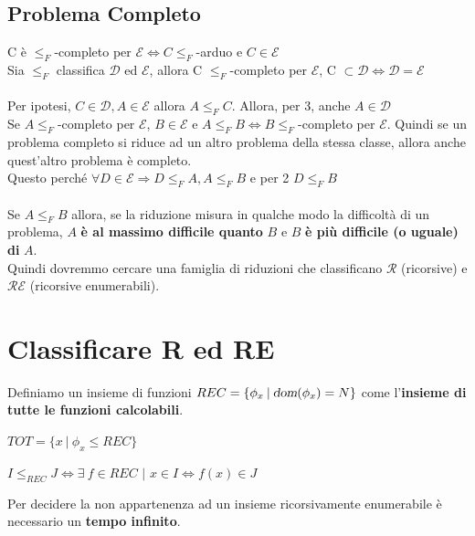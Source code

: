 \documentclass[10pt]{book}
\begin{document}
\subsection{Problema Completo}
C è $\leq_F$-completo per $\mathscr{E} \Leftrightarrow C \leq_F$-arduo e $C \in \mathscr{E}$\\
Sia $\leq_F$ classifica $\mathscr{D}$ ed $\mathscr{E}$, allora C $\leq_F$-completo per $\mathscr{E}$, C $\subset \mathscr{D} \Leftrightarrow \mathscr{D} = \mathscr{E}$\\\\
Per ipotesi, $C \in \mathscr{D}, A \in \mathscr{E}$ allora $A \leq_F C$. Allora, per 3, anche $A \in \mathscr{D}$\\
Se $A \leq_F$-completo per $\mathscr{E}$, $B \in \mathscr{E}$ e $A \leq_F B \Leftrightarrow B \leq_F$-completo per $\mathscr{E}$. Quindi se un problema completo si riduce ad un altro problema della stessa classe, allora anche quest'altro problema è completo.\\
Questo perché $\forall D \in \mathscr{E} \Rightarrow D \leq_F A, A \leq_F B$ e per 2 $D \leq_F B$\\\\
Se $A \leq_F B$ allora, se la riduzione misura in qualche modo la difficoltà di un problema, $A$ \textbf{è al massimo difficile quanto} $B$ e $B$ \textbf{è più difficile (o uguale) di} $A$.\\
Quindi dovremmo cercare una famiglia di riduzioni che classificano $\mathscr{R}$ (ricorsive) e $\mathscr{RE}$ (ricorsive enumerabili).
\section{Classificare R ed RE}
Definiamo un insieme di funzioni $REC = \{\phi_x\:|\:\textsl{dom}(\phi_x) = N\}$ come l'\textbf{insieme di tutte le funzioni calcolabili}.
\begin{list}{}{}
	\item $TOT = \{x\:|\:\phi_x \leq REC\}$
	\item $I \leq_{REC} J \Leftrightarrow \exists\: f \in REC$ $|$ $x \in I \Leftrightarrow f(x) \in J$
\end{list}
Per decidere la non appartenenza ad un insieme ricorsivamente enumerabile è necessario un \textbf{tempo infinito}.
\end{document}

